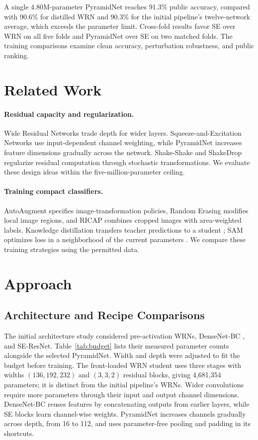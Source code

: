 \documentclass[letterpaper]{article} %
\begin{document}
A single 4.80M-parameter PyramidNet reaches 91.3\% public accuracy, compared with 90.6\% for distilled WRN and 90.3\% for the initial pipeline's twelve-network average, which exceeds the parameter limit. Cross-fold results favor SE over WRN on all five folds and PyramidNet over SE on two matched folds. The training comparisons examine clean accuracy, perturbation robustness, and public ranking.

\section{Related Work}
\paragraph{Residual capacity and regularization.}
Wide Residual Networks \cite{zagoruyko2016wide} trade depth for wider layers. Squeeze-and-Excitation Networks \cite{hu2018squeeze} use input-dependent channel weighting, while PyramidNet \cite{pyramid} increases feature dimensions gradually across the network. Shake-Shake \cite{shake} and ShakeDrop \cite{shakedrop} regularize residual computation through stochastic transformations. We evaluate these design ideas within the five-million-parameter ceiling.

\paragraph{Training compact classifiers.}
AutoAugment \cite{aa} specifies image-transformation policies, Random Erasing \cite{erasing} modifies local image regions, and RICAP \cite{takahashi2018ricap} combines cropped images with area-weighted labels. Knowledge distillation transfers teacher predictions to a student \cite{hinton2015distilling}; SAM optimizes loss in a neighborhood of the current parameters \cite{sam}. We compare these training strategies using the permitted data.

\section{Approach}
\subsection{Architecture and Recipe Comparisons}
The initial architecture study considered pre-activation WRNs, DenseNet-BC \cite{huang2017densely}, and SE-ResNet. Table~\ref{tab:budget} lists their measured parameter counts alongside the selected PyramidNet. Width and depth were adjusted to fit the budget before training. The front-loaded WRN student uses three stages with widths $(136,192,232)$ and $(3,3,2)$ residual blocks, giving 4,681,354 parameters; it is distinct from the initial pipeline's WRNs. Wider convolutions require more parameters through their input and output channel dimensions. DenseNet-BC reuses features by concatenating outputs from earlier layers, while SE blocks learn channel-wise weights. PyramidNet increases channels gradually across depth, from 16 to 112, and uses parameter-free pooling and padding in its shortcuts.
\end{document}

